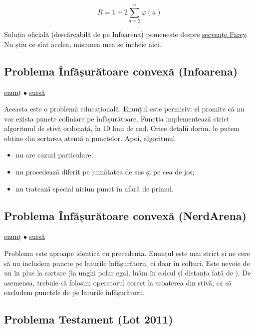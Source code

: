 \documentclass[../main.tex]{subfiles}
\begin{document}
$$R = 1 + 2 \sum_{a=2}^{n} \varphi(a)$$

Soluția oficială (descărcabilă de pe Infoarena) pomenește despre \href{https://en.wikipedia.org/wiki/Farey_sequence}{secvențe Farey}. Nu știu ce sînt acelea, misiunea mea se încheie aici. 

\subsection{Problema Înfășurătoare convexă (Infoarena)}
\label{problem:infasuratoare-convexa-1}

\href{https://www.infoarena.ro/problema/infasuratoare}{enunț}
$\bullet$
\hyperref[code:infasuratoare-convexa-1]{sursă}

Aceasta este o problemă educațională. Enunțul este permisiv: el promite că nu vor exista puncte coliniare pe înfășurătoare. Funcția  implementează strict algoritmul de stivă ordonată, în 10 linii de cod. Orice detalii dorim, le putem obține din sortarea atentă a punctelor. Apoi, algoritmul

\begin{itemize}
  \item nu are cazuri particulare;
  \item nu procedează diferit pe jumătatea de sus și pe cea de jos;
  \item nu tratează special niciun punct în afară de primul.
\end{itemize}

\subsection{Problema Înfășurătoare convexă (NerdArena)}
\label{problem:infasuratoare-convexa-2}

\href{https://www.nerdarena.ro/problema/infasuratoare}{enunț}
$\bullet$
\hyperref[code:infasuratoare-convexa-2]{sursă}

Problema este aproape identică cu precedenta. Enunțul este mai strict și ne cere să nu includem puncte pe laturile înfășurătorii, ci doar în colțuri. Este nevoie de un  în plus la sortare (la unghi polar egal, luăm în calcul și distanța față de ). De asemenea, trebuie să folosim operatorul corect la scoaterea din stivă, ca să excludem punctele de pe laturile înfășurătorii.

\subsection{Problema Testament (Lot 2011)}
\label{problem:testament}
\end{document}
